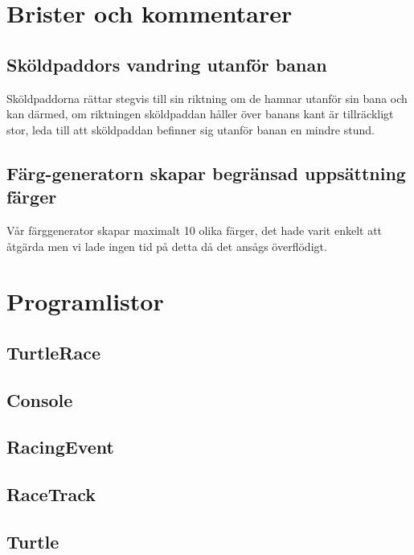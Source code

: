 \documentclass[a4paper]{article}
\begin{document}
\section{Brister och kommentarer}

\subsection{Sköldpaddors vandring utanför banan}
Sköldpaddorna rättar stegvis till sin riktning om de hamnar utanför sin bana och kan därmed, om riktningen sköldpaddan håller över banans kant är tillräckligt stor, leda till att sköldpaddan befinner sig utanför banan en mindre stund.

\subsection{Färg-generatorn skapar begränsad uppsättning färger}
Vår färggenerator skapar maximalt 10 olika färger, det hade varit enkelt att åtgärda men vi lade ingen tid på detta då det ansågs överflödigt.
      
\section{Programlistor}

\subsection{TurtleRace}

\subsection{Console}

\subsection{RacingEvent}

\subsection{RaceTrack}

\subsection{Turtle}
\end{document}
